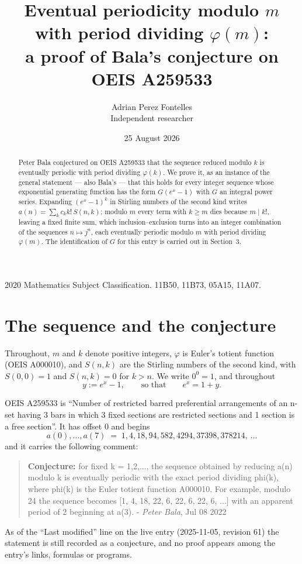 \documentclass[11pt,a4paper]{article}
\title{Eventual periodicity modulo $m$ with period dividing $\varphi(m)$:\\a proof of Bala's conjecture on OEIS A259533}
\author{Adrian Perez Fontelles\\ \small Independent researcher}
\date{25 August 2026}
\theoremstyle{plain}
\theoremstyle{definition}
\begin{document}
\maketitle

\begin{abstract}
Peter Bala conjectured on OEIS A259533 that the sequence reduced modulo $k$ is eventually periodic with period dividing $\varphi(k)$. We prove it, as an instance of the general statement --- also Bala's --- that this holds for every integer sequence whose exponential generating function has the form $G(e^{x}-1)$ with $G$ an integral power series. Expanding $(e^{x}-1)^{k}$ in Stirling numbers of the second kind writes $a(n)=\sum_{k}c_{k}k!\,S(n,k)$; modulo $m$ every term with $k\ge m$ dies because $m\mid k!$, leaving a fixed finite sum, which inclusion--exclusion turns into an integer combination of the sequences $n\mapsto j^{n}$, each eventually periodic modulo $m$ with period dividing $\varphi(m)$. The identification of $G$ for this entry is carried out in Section~3.
\end{abstract}

\noindent\small 2020 Mathematics Subject Classification. 11B50, 11B73, 05A15, 11A07.\normalsize

\section{The sequence and the conjecture}

Throughout, $m$ and $k$ denote positive integers, $\varphi$ is Euler's totient function
(OEIS A000010), and $S(n,k)$ are the Stirling numbers of the second kind, with
$S(0,0)=1$ and $S(n,k)=0$ for $k>n$. We write $0^{0}=1$, and throughout
\[
y := e^{x}-1, \qquad\text{so that}\qquad e^{x}=1+y .
\]

OEIS A259533 is ``Number of restricted barred preferential arrangements of an n-set having 3 bars in which 3 fixed sections are restricted sections and 1 section is a free section''. It has offset $0$ and begins
\[
a(0),\dots,a(7)\;=\;1, 4, 18, 94, 582, 4294, 37398, 378214,\ \dots
\]
and it carries the following comment:
\begin{quote}\small
\textbf{Conjecture:} for fixed k = 1,2,..., the sequence obtained by reducing a(n) modulo k is eventually periodic with the exact period dividing phi(k), where phi(k) is the Euler totient function A000010. For example, modulo 24 the sequence becomes [1, 4, 18, 22, 6, 22, 6, 22, 6, ...] with an apparent period of 2 beginning at a(3). - \emph{Peter Bala}, Jul 08 2022
\end{quote}
As of the ``Last modified'' line on the live entry (2025-11-05, revision 61) the
statement is still recorded as a conjecture, and no proof appears among the entry's links,
formulas or programs.
\end{document}
